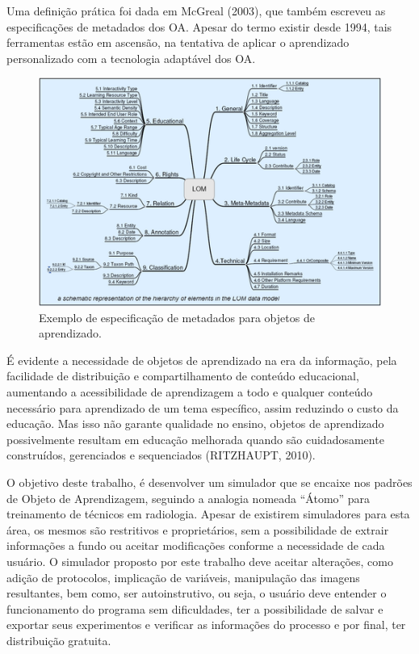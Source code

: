 \documentclass[12pt,openright,oneside,a4paper,english,french,spanish,brazil]{unifil}
\begin{document}
\par Uma definição prática foi dada em McGreal (2003), que também escreveu as especificações de metadados dos OA. Apesar do termo existir desde 1994, tais ferramentas estão em ascensão, na tentativa de aplicar o aprendizado personalizado com a tecnologia adaptável dos OA.
	\begin{figure}[htb]
	\centering
	\includegraphics[scale=0.8]{images/lom.png}
	\caption{Exemplo de especificação de metadados para objetos de aprendizado.}
	\label{img:lom}
\end{figure}
\par É evidente a necessidade de objetos de aprendizado na era da informação, pela facilidade de distribuição e compartilhamento de conteúdo educacional, aumentando a acessibilidade de aprendizagem a todo e qualquer conteúdo necessário para aprendizado de um tema específico, assim reduzindo o custo da educação. Mas isso não garante qualidade no ensino, objetos de aprendizado possivelmente resultam em educação melhorada quando são cuidadosamente construídos, gerenciados e sequenciados (\uppercase{Ritzhaupt}, 2010).
\par O objetivo deste trabalho, é desenvolver um simulador que se encaixe nos padrões de Objeto de Aprendizagem, seguindo a analogia nomeada ``Átomo'' para treinamento de técnicos em radiologia. Apesar de existirem simuladores para esta área, os mesmos são restritivos e proprietários, sem a possibilidade de extrair informações a fundo ou aceitar modificações conforme a necessidade de cada usuário. O simulador proposto por este trabalho deve aceitar alterações, como adição de protocolos, implicação de variáveis, manipulação das imagens resultantes, bem como, ser autoinstrutivo, ou seja, o usuário deve entender o funcionamento do programa sem dificuldades, ter a possibilidade de salvar e exportar seus experimentos e verificar as informações do processo e por final, ter distribuição gratuita.
\end{document}
